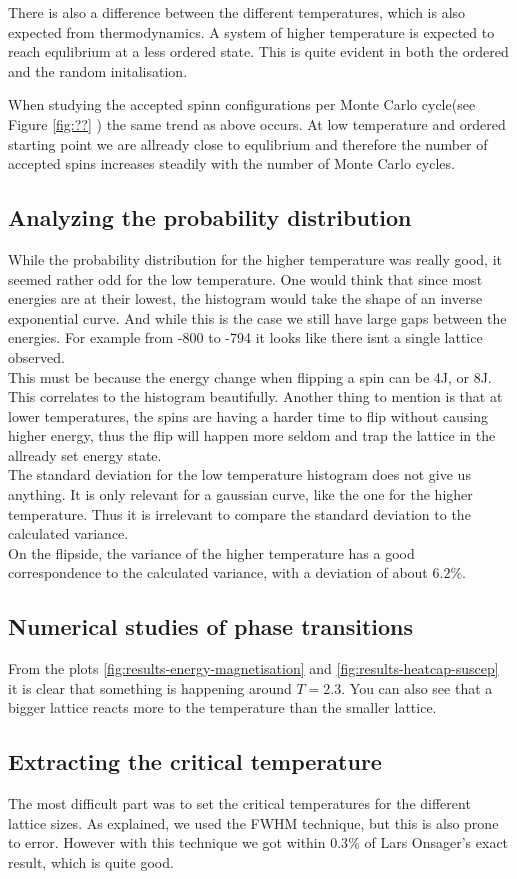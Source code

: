 \documentclass[../main.tex]{subfiles}
\begin{document}
There is also a difference between the different temperatures, which is also expected from thermodynamics. A system of higher temperature is expected to reach equlibrium at a less ordered state. This is quite evident in both the ordered and the random initalisation.

When studying the accepted spinn configurations per Monte Carlo cycle(see Figure \ref{fig:??} ) the same trend as above occurs. At low temperature and ordered starting point we are allready close to equlibrium and therefore the number of accepted spins increases steadily with the number of Monte Carlo cycles.


\subsection{Analyzing the probability distribution}
While the probability distribution for the higher temperature was really good, it seemed rather odd for the low temperature. One would think that since most energies are at their lowest, the histogram would take the shape of an inverse exponential curve. And while this is the case we still have large gaps between the energies. For example from -800 to -794 it looks like there isnt a single lattice observed. \\
This must be because the energy change when flipping a spin can be 4J, or 8J. This correlates to the histogram beautifully. Another thing to mention is that at lower temperatures, the spins are having a harder time to flip without causing higher energy, thus the flip will happen more seldom and trap the lattice in the allready set energy state.\\
The standard deviation for the low temperature histogram does not give us anything. It is only relevant for a gaussian curve, like the one for the higher temperature. Thus it is irrelevant to compare the standard deviation to the calculated variance.\\
On the flipside, the variance of the higher temperature has a good correspondence to the calculated variance, with a deviation of about $6.2\%$.


\subsection{Numerical studies of phase transitions}
From the plots \ref{fig:results-energy-magnetisation} and \ref{fig:results-heatcap-suscep} it is clear that something is happening around $T = 2.3$. You can also see that a bigger lattice reacts more to the temperature than the smaller lattice.\\



\subsection{Extracting the critical temperature}
The most difficult part was to set the critical temperatures for the different lattice sizes. As explained, we used the FWHM technique, but this is also prone to error. However with this technique we got within $0.3\%$ of Lars Onsager's exact result, which is quite good.
\end{document}
